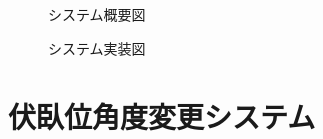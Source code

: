 \documentclass[uplatex]{jsarticle}
\begin{document}
 \begin{figure}[tb]
  \centering
  \caption{システム概要図}
  \label{fig:about_system}

  \centering
  \caption{システム実装図}
  \label{fig:build_system}

\end{figure}

\section{伏臥位角度変更システム}
\end{document}
